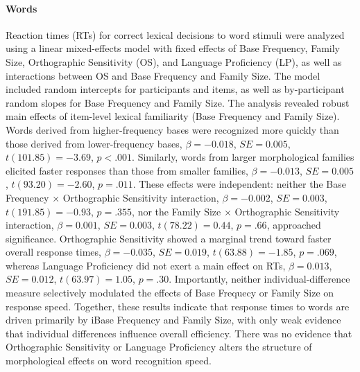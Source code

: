 \documentclass[preprint,12pt, authoryear, review]{elsarticle}
\begin{document}
	\paragraph*{Words}
	Reaction times (RTs) for correct lexical decisions to word stimuli were analyzed using a linear mixed-effects model with fixed effects of Base Frequency, Family Size, Orthographic Sensitivity (OS), and Language Proficiency (LP), as well as interactions between OS and Base Frequency and Family Size. The model included random intercepts for participants and items, as well as by-participant random slopes for Base Frequency and Family Size. The analysis revealed robust main effects of item-level lexical familiarity (Base Frequency and Family Size). Words derived from higher-frequency bases were recognized more quickly than those derived from lower-frequency bases, $\beta = -0.018$, $SE = 0.005$, $t(101.85) = -3.69$, $p < .001$. Similarly, words from larger morphological families elicited faster responses than those from smaller families, $\beta = -0.013$, $SE = 0.005$, $t(93.20) = -2.60$, $p = .011$. These effects were independent: neither the Base Frequency × Orthographic Sensitivity interaction, $\beta = -0.002$, $SE = 0.003$, $t(191.85) = -0.93$, $p = .355$, nor the Family Size × Orthographic Sensitivity interaction, $\beta = 0.001$, $SE = 0.003$, $t(78.22) = 0.44$, $p = .66$, approached significance. Orthographic Sensitivity showed a marginal trend toward faster overall response times, $\beta = -0.035$, $SE = 0.019$, $t(63.88) = -1.85$, $p = .069$, whereas Language Proficiency did not exert a main effect on RTs, $\beta = 0.013$, $SE = 0.012$, $t(63.97) = 1.05$, $p = .30$. Importantly, neither individual-difference measure selectively modulated the effects of Base Frequecy or Family Size on response speed. Together, these results indicate that response times to words are driven primarily by iBase Frequency and Family Size, with only weak evidence that individual differences influence overall efficiency. There was no evidence that Orthographic Sensitivity or Language Proficiency alters the structure of morphological effects on word recognition speed.
\end{document}
